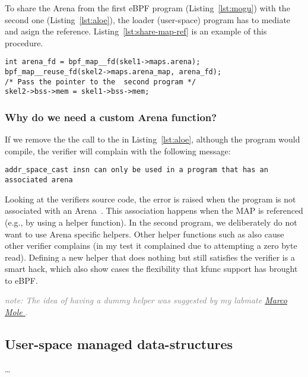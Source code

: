 \documentclass{article}
\begin{document}
To share the Arena from the first eBPF program (Listing~\ref{lst:mogu})
with the second one (Listing~\ref{lst:aloe}), the loader (user-space) program
has to mediate and asign the reference. Listing~\ref{lst:share-map-ref} is an
example of this procedure.

\begin{minipage}{\linewidth}
\begin{flushleft}
\begin{lstlisting}[caption={Loader program assigning the Arena from the first program to the second program}, label={lst:share-map-ref}]
int arena_fd = bpf_map__fd(skel1->maps.arena);
bpf_map__reuse_fd(skel2->maps.arena_map, arena_fd);
/* Pass the pointer to the  second program */
skel2->bss->mem = skel1->bss->mem;
\end{lstlisting}
\end{flushleft}
\end{minipage}

\subsubsection{Why do we need a custom Arena function?}
\label{sec:need_custom}
If we remove the the call to the  in
Listing~\ref{lst:aloe}, although the program would compile, the verifier will
complain with the following message:

\begin{minipage}{\linewidth{}}
\begin{flushleft}
\begin{lstlisting}[caption={Verifier error message when the Arena is not referenced in the program}]
addr_space_cast insn can only be used in a program that has an associated arena
\end{lstlisting}
\end{flushleft}
\end{minipage}

Looking at the verifiers source code, the error is raised when the program
is not associated with an Arena~\cite{verifier_arena_not_set}. This association
happens when the MAP is referenced (e.g., by using a helper function).
In the second program, we deliberately do not want to use Arena specific
helpers. Other helper functions such as  also cause
other verifier complains (in my test it complained due to attempting a zero
byte read). Defining a new helper that does nothing but still satisfies the
verifier is a smart hack, which also show cases the flexibility that kfunc
support has brought to eBPF.

\textcolor{gray}{\textit{note: The idea of having a dummy helper was suggested
by my labmate \href{https://github.com/marcomole00/}{Marco Mole }.}}


\subsection{User-space managed data-structures}

\dots{}




\end{document}
